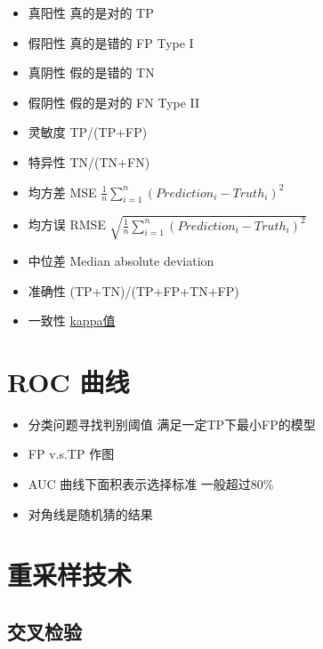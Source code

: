 \documentclass[]{book}
\providecommand{\tightlist}{%
  \setlength{\itemsep}{0pt}\setlength{\parskip}{0pt}}
\begin{document}
\begin{itemize}
\tightlist
\item
  真阳性 真的是对的 TP
\item
  假阳性 真的是错的 FP Type I
\item
  真阴性 假的是错的 TN
\item
  假阴性 假的是对的 FN Type II
\item
  灵敏度 TP/(TP+FP)
\item
  特异性 TN/(TN+FN)
\item
  均方差 MSE \(\frac{1}{n} \sum_{i=1}^n (Prediction_i - Truth_i)^2\)
\item
  均方误 RMSE \(\sqrt{\frac{1}{n} \sum_{i=1}^n(Prediction_i - Truth_i)^2}\)
\item
  中位差 Median absolute deviation
\item
  准确性 (TP+TN)/(TP+FP+TN+FP)
\item
  一致性 \href{https://en.wikipedia.org/wiki/Cohen\%27s_kappa}{kappa值}
\end{itemize}

\hypertarget{roc-}{%
\section{ROC 曲线}\label{roc-}}

\begin{itemize}
\tightlist
\item
  分类问题寻找判别阈值 满足一定TP下最小FP的模型
\item
  FP v.s.TP 作图
\item
  AUC 曲线下面积表示选择标准 一般超过80\%
\item
  对角线是随机猜的结果
\end{itemize}

\section{重采样技术}

\subsection{交叉检验}
\end{document}
